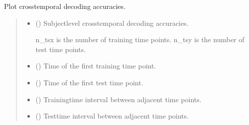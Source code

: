 \documentclass[letterpaper,10pt,english]{sphinxhowto}
\begin{document}
\begin{fulllineitems}
\pysigstopsignatures
\sphinxAtStartPar
Plot cross\sphinxhyphen{}temporal decoding accuracies.
\begin{quote}\begin{description}
\begin{itemize}
\item {} 
\sphinxAtStartPar
{} (\sphinxstyleliteralemphasis{\sphinxupquote{, }}\sphinxstyleliteralemphasis{\sphinxupquote{ {[}}}\sphinxstyleliteralemphasis{\sphinxupquote{, }}\sphinxstyleliteralemphasis{\sphinxupquote{, }}\sphinxstyleliteralemphasis{\sphinxupquote{{]}}}) \textendash{} 
\sphinxAtStartPar
Subject\sphinxhyphen{}level cross\sphinxhyphen{}temporal decoding accuracies.

\sphinxAtStartPar
n\_tsx is the number of training time points.
n\_tsy is the number of test time points.


\item {} 
\sphinxAtStartPar
{} (\sphinxstyleliteralemphasis{\sphinxupquote{, }}) \textendash{} Time of the first training time point.

\item {} 
\sphinxAtStartPar
{} (\sphinxstyleliteralemphasis{\sphinxupquote{, }}) \textendash{} Time of the first test time point.

\item {} 
\sphinxAtStartPar
{} (\sphinxstyleliteralemphasis{\sphinxupquote{, }}) \textendash{} Training\sphinxhyphen{}time interval between adjacent time points.

\item {} 
\sphinxAtStartPar
{} (\sphinxstyleliteralemphasis{\sphinxupquote{, }}) \textendash{} Test\sphinxhyphen{}time interval between adjacent time points.


\end{itemize}
\end{description}
\end{quote}
\end{fulllineitems}
\end{document}
